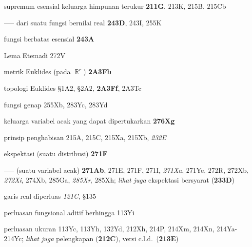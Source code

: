 supremum esensial keluarga himpunan terukur {\bf 211G}, 213K,
215B, 215Cb


----- dari suatu fungsi bernilai real {\bf 243D}, 243I, 255K


fungsi berbatas esensial {\bf 243A}






Lema Etemadi 272V




metrik Euklides (pada $\BbbR^r$) {\bf 2A3Fb}


topologi Euklides \S1A2, \S2A2, {\bf 2A3Ff}, 2A3Tc



fungsi genap 255Xb, 283Yc, 283Yd




keluarga variabel acak yang dapat dipertukarkan {\bf 276Xg}




prinsip penghabisan 215A, 215C, 215Xa, 215Xb,
{\it 232E}











ekspektasi (suatu distribusi) {\bf 271F}


----- (suatu variabel acak) {\bf 271Ab}, 271E, 271F, 271I,
{\it 271Xa}, 271Ye,
272R, 272Xb, {\it 272Xi}, 274Xb, 285Ga, {\it 285Xr}, 285Xh;
  {\it lihat juga} ekspektasi bersyarat ({\bf 233D})











garis real diperluas {\it 121C}, \S135





perluasan fungsional aditif berhingga 113Yi



perluasan ukuran 113Yc, 113Yh, 132Yd,
  212Xh, 214P, 214Xm, 214Xn,
214Ya-214Yc;  
  {\it lihat juga} pelengkapan ({\bf 212C}), versi c.l.d.\ ({\bf 213E})
  

















